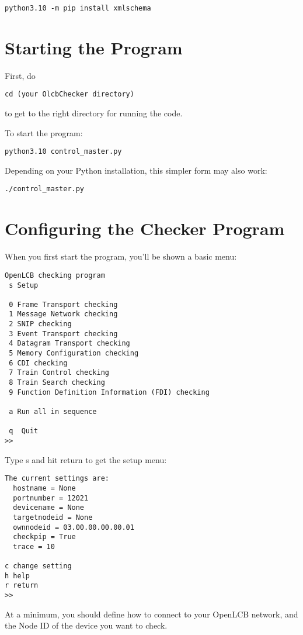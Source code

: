 \begin{verbatim}
python3.10 -m pip install xmlschema
\end{verbatim}

\section{Starting the Program}

First, do
\begin{verbatim}
cd (your OlcbChecker directory)
\end{verbatim}
to get to the right directory for running the code.

To start the program:
\begin{verbatim}
python3.10 control_master.py
\end{verbatim}

Depending on your Python installation, this simpler form may also work:
\begin{verbatim}
./control_master.py
\end{verbatim}


\section{Configuring the Checker Program}

When you first start the program, you'll be shown a basic menu:

\begin{verbatim}
OpenLCB checking program
 s Setup

 0 Frame Transport checking
 1 Message Network checking
 2 SNIP checking
 3 Event Transport checking
 4 Datagram Transport checking
 5 Memory Configuration checking
 6 CDI checking
 7 Train Control checking
 8 Train Search checking
 9 Function Definition Information (FDI) checking
  
 a Run all in sequence

 q  Quit
>>
\end{verbatim}

Type s and hit return to get the setup menu:

\begin{verbatim}
The current settings are:
  hostname = None
  portnumber = 12021
  devicename = None
  targetnodeid = None
  ownnodeid = 03.00.00.00.00.01
  checkpip = True
  trace = 10

c change setting
h help
r return
>>
\end{verbatim}

At a minimum, you should define how to connect to your OpenLCB network,
and the Node ID of the device you want to check.

